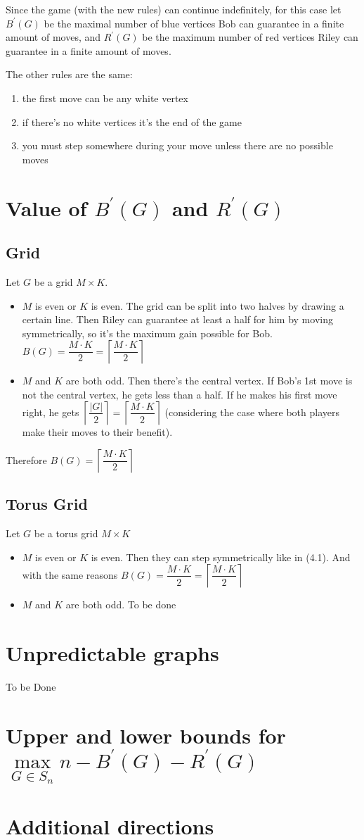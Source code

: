 \documentclass[12pt,a4paper, flushleft]{article}
\newcommand{\p}[1]{#1^{\prime}}
\newcommand{\ceil}[1]{\left\lceil #1 \right\rceil}
\begin{document}
Since the game (with the new rules) can continue indefinitely, for this case let $\p B (G)$ be the
maximal number of blue vertices Bob can guarantee in a finite amount of moves, and $\p R (G)$ be
the maximum number of red vertices Riley can guarantee in a finite amount of moves.

The other rules are the same:
\begin{enumerate}
	\item the first move can be any white vertex
	\item if there's no white vertices it's the end of the game
	\item you must step somewhere during your move unless there are no possible moves
\end{enumerate}	
\section{Value of $\p B(G) $ and $\p R(G)$}
\subsection{Grid}
Let $G$ be a grid $M\times K$.

\begin{itemize}
	\item $M$ is even or $K$ is even. The grid can be split into two halves by drawing a certain line. Then Riley can guarantee at least a half for him by moving symmetrically, so it's the maximum gain possible for Bob. $B(G) = \dfrac{M\cdot K}{2} = \ceil{\dfrac{M\cdot K}{2}}$
	\item $M$ and $K$ are both odd. Then there's the central vertex. If Bob's 1st move is not the central vertex, he gets less than a half. If he makes his first move right, he gets $\ceil{\dfrac{|G|}{2}} = \ceil{\dfrac{M\cdot K}{2}}$ (considering the case where both players make their moves to their benefit).
\end{itemize}

Therefore $B(G) = \ceil{\dfrac{M\cdot K}{2}}$

\subsection{Torus Grid}
Let $G$ be a torus grid $M\times K$

\begin{itemize}
	\item $M$ is even or $K$ is even. Then they can step symmetrically like in (4.1). And with the same reasons $B(G) = \dfrac{M\cdot K}{2} = \ceil{\dfrac{M\cdot K}{2}}$
	\item $M$ and $K$ are both odd.  To be done
\end{itemize}
\section{Unpredictable graphs} To be Done

\section{Upper and lower bounds for $\max\limits_{G\in S_n}n - \p B(G) - \p R(G)$}

\section{Additional directions}
\end{document}
